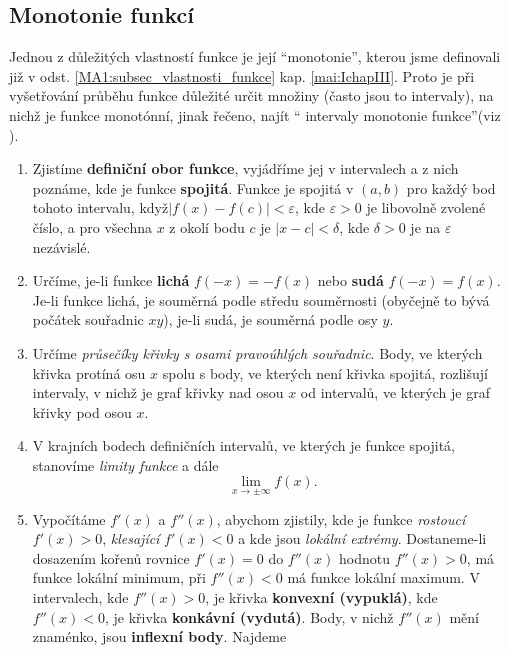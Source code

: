 {    \subsection{Monotonie funkcí}
      Jednou z důležitých vlastností funkce je její \textquotedblleft monotonie\textquotedblright, 
      kterou jsme definovali již v odst. \ref{MA1:subsec_vlastnosti_funkce} kap. 
      \ref{mai:IchapIII}. Proto je při vyšetřování průběhu funkce důležité určit množiny (často 
      jsou to intervaly), na nichž je funkce monotónní, jinak řečeno, najít \textquotedblleft 
      intervaly monotonie funkce\textquotedblright (viz \cite[s.~208]{Brabec1989}). 
    \begin{enumerate}
      \item Zjistíme \textbf{definiční obor funkce}, vyjádříme jej v intervalech a z nich poznáme,  
            kde je funkce \textbf{spojitá}. Funkce je spojitá v $(a,b)$ pro každý bod tohoto 
            intervalu, když$|f(x)-f(c)|<\varepsilon$, kde $\varepsilon>0$ je libovolně zvolené 
            číslo, a pro všechna $x$ z okolí bodu $c$ je $|x-c|<\delta$, kde $\delta>0$ je na 
            $\varepsilon$ nezávislé.
      \item Určíme, je-li funkce \textbf{lichá} $f(-x)=-f(x)$ nebo \textbf{sudá} $f(-x)=f(x)$.   
            Je-li funkce lichá, je souměrná podle středu souměrnosti (obyčejně to bývá počátek 
            souřadnic $xy$), je-li sudá, je souměrná podle osy $y$.
      \item Určíme \emph{průsečíky křivky s osami pravoúhlých souřadnic}. Body, ve kte\-rých 
            křivka  protíná osu $x$ spolu s body, ve kte\-rých není křivka spojitá, rozlišují 
            intervaly, v nichž je graf křivky nad osou $x$ od intervalů, ve kterých je graf křivky 
            pod osou $x$.
      \item V krajních bodech definičních intervalů, ve kterých je funkce spojitá, stano\-víme 
      \emph{limity funkce} a dále $$\lim_{x \to \pm \infty}f(x).$$
      \item Vypočítáme $f'(x)$ a $f''(x)$, abychom zjistily, kde je funkce \emph{rostoucí}     
            $f'(x)>0$, \emph{klesající} $f'(x)<0$ a kde jsou \emph{lokální extrémy}. Dostaneme-li 
            dosazením kořenů rovnice $f'(x)=0$ do $f''(x)$ hodnotu $f''(x)>0$, má funkce lokální 
            minimum, při $f''(x)<0$ má funkce lokální maximum. V intervalech, kde $f''(x)>0$, je 
            křivka \textbf{konvexní (vypuklá)}, kde $f''(x)<0$, je křivka \textbf{konkávní 
            (vydutá)}. Body, v nichž $f''(x)$ mění znaménko, jsou \textbf{inflexní body}. Najdeme 

\end{enumerate}}

